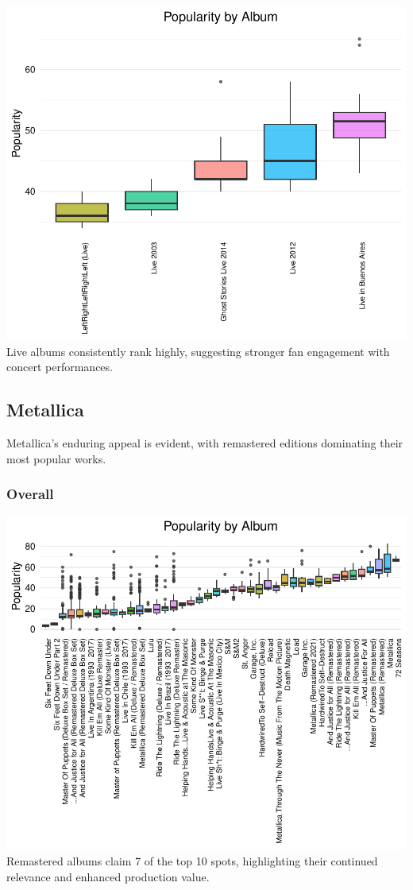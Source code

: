 \documentclass[11pt,preprint]{elsarticle}
\numberwithin{equation}{section}
\numberwithin{figure}{section}
\numberwithin{table}{section}
\begin{document}
\includegraphics{Question2_files/figure-latex/unnamed-chunk-2-1.pdf}
Live albums consistently rank highly, suggesting stronger fan engagement
with concert performances.

\newpage

\subsection{Metallica}\label{metallica}

Metallica's enduring appeal is evident, with remastered editions
dominating their most popular works.

\subsubsection{Overall}\label{overall-1}

\includegraphics{Question2_files/figure-latex/unnamed-chunk-3-1.pdf}
Remastered albums claim 7 of the top 10 spots, highlighting their
continued relevance and enhanced production value.
\end{document}
